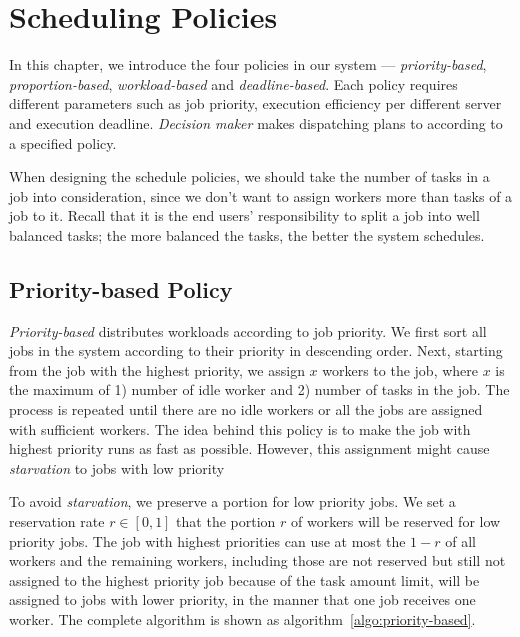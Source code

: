 \chapter{Scheduling Policies}\label{sec:policy}

In this chapter, we introduce the four policies in our system ---
\emph{priority-based}, \emph{proportion-based}, \emph{workload-based}
and \emph{deadline-based}.
Each policy requires different parameters such as job priority,
execution efficiency per different server and execution deadline.
\emph{Decision maker} makes dispatching plans to according to a
specified policy.

When designing the schedule policies, we should take the number of tasks
in a job into consideration, since we don't want to assign workers more
than tasks of a job to it.
Recall that it is the end users' responsibility to split a job into well
balanced tasks; the more balanced the tasks, the better the system
schedules.


\section{Priority-based Policy}	%

\emph{Priority-based} distributes workloads according to job priority. 
We first sort all jobs in the system according to their priority in 
descending order.
Next, starting from the job with the highest priority, we assign $x$
workers to the job, where $x$ is the maximum of 1) number of idle worker
and 2) number of tasks in the job.
The process is repeated until there are no idle workers or all the jobs
are assigned with sufficient workers.
The idea behind this policy is to make the job with highest priority 
runs as fast as possible.
However, this assignment might cause \emph{starvation} to jobs with 
low priority

To avoid \emph{starvation}, we preserve a portion for low priority jobs.
We set a reservation rate $r \in [0,1]$ that the portion $r$ of workers
will be reserved for low priority jobs.
The job with highest priorities can use at most the $1-r$ of all workers
and the remaining workers, including those are not reserved but still not
assigned to the highest priority job because of the task amount limit,
will be assigned to jobs with lower priority, in the manner that one job
receives one worker.
The complete algorithm is shown as algorithm~\ref{algo:priority-based}.

